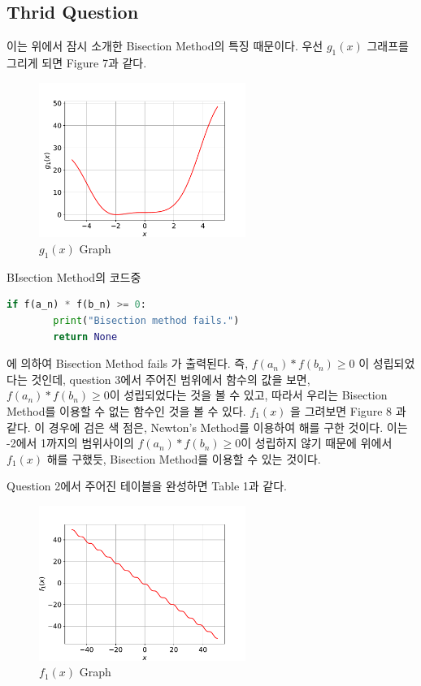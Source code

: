 \documentclass[11pt]{article}
\begin{document}
\subsection{Thrid Question} 
이는 위에서 잠시 소개한 Bisection Method의 특징 때문이다. 우선 $g_1(x)$ 그래프를 그리게 되면 Figure 7과 같다. 
\begin{figure}[!ht]
  \centering
  \includegraphics[width=0.6\textwidth]{Bisectoin_Question2.pdf}
  \caption{$g_1(x)$ Graph}
\end{figure}

\noindent  
BIsection Method의 코드중 
\begin{lstlisting}[language=Python]
    if f(a_n) * f(b_n) >= 0:
        print("Bisection method fails.")
        return None
\end{lstlisting}
에 의하여 Bisection Method fails 가 출력된다. 즉, $f(a_n) * f(b_n) \geq 0$ 이 성립되었다는 것인데, question 3에서 주어진 범위에서 함수의 값을 보면, $ f(a_n) * f(b_n) \geq 0$이 성립되었다는 것을 볼 수 있고, 따라서 우리는 Bisection Method를 이용할 수 없는 함수인 것을 볼 수 있다. $f_1(x)$ 을 그려보면 Figure 8 과 같다. 이 경우에 검은 색 점은, Newton's Method를 이용하여 해를 구한 것이다. 이는 -2에서 1까지의 범위사이의 $ f(a_n) * f(b_n) \geq 0$이 성립하지 않기 때문에 위에서 $f_1(x)$ 해를 구했듯, Bisection Method를 이용할 수 있는 것이다.

\clearpage


\noindent  
Question 2에서 주어진 테이블을 완성하면 Table 1과 같다. 

\begin{figure}[!ht]
\centering
  \includegraphics[width=0.6\textwidth]{Bisection_method1.pdf}
  \caption{$f_1(x)$ Graph}
\end{figure}
\end{document}
